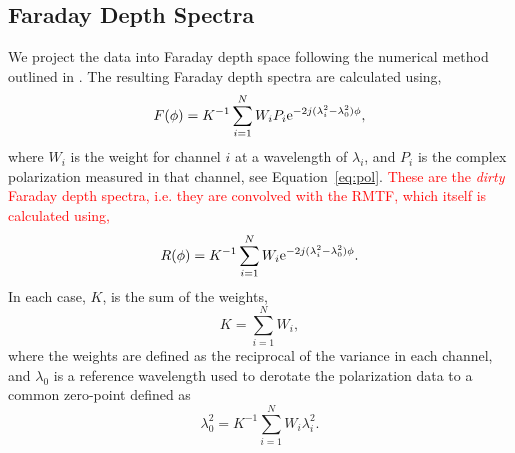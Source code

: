 \documentclass[fleqn,usenatbib]{mnras}
\begin{document}
\subsection{Faraday Depth Spectra}
\label{sec:fdspectra}

%
%
We project the data into Faraday depth space following the numerical method outlined in \cite{2005A&A...441.1217B}. The resulting Faraday depth spectra are calculated using,
%
\begin{equation}
F(\phi) = K^{-1}\sum_{i = 1}^{N}{W_i P_i {\rm e}^{-2j (\lambda_i^2 - \lambda_0^2) \phi}},
\end{equation}
%
where $W_i$ is the weight for channel $i$ at a wavelength of $\lambda_i$, and $P_i$ is the complex polarization measured in that channel, see Equation~\ref{eq:pol}. \textcolor{red}{These are the \emph{dirty} Faraday depth spectra, i.e. they are convolved with the RMTF, which itself is calculated using,}
%
\begin{equation}
R(\phi) = K^{-1}\sum_{i = 1}^{N}{W_i {\rm e}^{-2j (\lambda_i^2 - \lambda_0^2) \phi}}.
\end{equation}
%
In each case, $K$, is the sum of the weights,
%
\begin{equation}
K = \sum_{i = 1}^{N}{W_i},
\end{equation}
%
where the weights are defined as the reciprocal of the variance in each channel, and $\lambda_0$ is a reference wavelength used to derotate the polarization data to a common zero-point defined as
%
\begin{equation}
\lambda_0^2 = K^{-1}\sum_{i = 1}^{N}{W_i \lambda_i^2}.
\end{equation}
\end{document}
